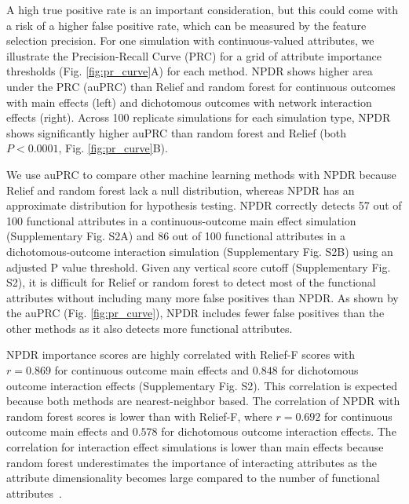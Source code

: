 \documentclass{bioinfo}
\begin{document}
A high true positive rate is an important consideration, but this could come with a risk of a higher false positive rate, which can be measured by the feature selection precision. 
For one simulation with continuous-valued attributes, we illustrate the Precision-Recall Curve (PRC) for a grid of attribute importance thresholds (Fig. \ref{fig:pr_curve}A) for each method. NPDR shows higher area under the PRC (auPRC) than Relief and random forest for continuous outcomes with main effects (left) and dichotomous outcomes with network interaction effects (right).
Across 100 replicate simulations for each simulation type, NPDR shows significantly higher auPRC than random forest and Relief (both $P < 0.0001$, Fig. \ref{fig:pr_curve}B). 


We use auPRC to compare other machine learning methods with NPDR because Relief and random forest lack a null distribution, whereas NPDR has an approximate distribution for hypothesis testing.
NPDR correctly detects 57 out of 100 functional attributes in a continuous-outcome main effect simulation (Supplementary Fig. S2A) and 86 out of 100 functional attributes in a dichotomous-outcome interaction simulation (Supplementary Fig. S2B) using an adjusted P value threshold.
Given any vertical score cutoff (Supplementary Fig. S2), it is difficult for Relief or random forest to detect most of the functional attributes without including many more false positives than NPDR.
As shown by the auPRC (Fig. \ref{fig:pr_curve}), NPDR includes fewer false positives than the other methods as it also detects more functional attributes.

NPDR importance scores are highly correlated with Relief-F scores with $r = 0.869$ for continuous outcome main effects and $0.848$ for dichotomous outcome interaction effects (Supplementary Fig. S2).
This correlation is expected because both methods are nearest-neighbor based.
The correlation of NPDR with random forest scores is lower than with Relief-F, where $r = 0.692$ for continuous outcome main effects and $0.578$ for dichotomous outcome interaction effects.
The correlation for interaction effect simulations is lower than main effects because random forest underestimates the importance of interacting attributes as the attribute dimensionality becomes large compared to the number of functional attributes~\citep{mckinney2009capturing,winham2012snp}.
\end{document}
